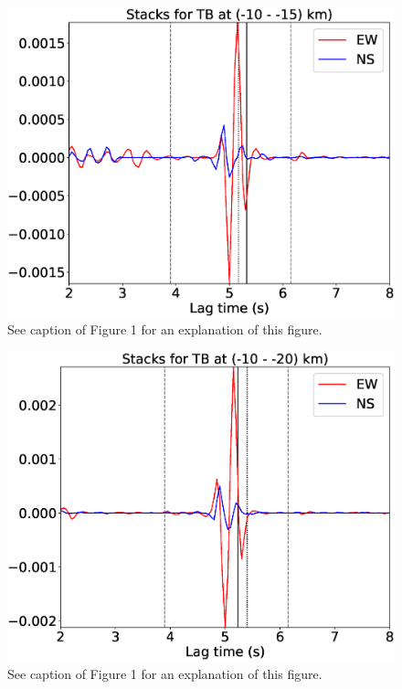 \documentclass[letterpaper, 12pt]{article}
\begin{document}
\begin{figure}[H]
\includegraphics[width=\linewidth]{figures/intervals/TB_-10_-15_stacks.eps}
\caption{See caption of Figure 1 for an explanation of this figure.}
\end{figure}

\begin{figure}[H]
\includegraphics[width=\linewidth]{figures/intervals/TB_-10_-20_stacks.eps}
\caption{See caption of Figure 1 for an explanation of this figure.}
\end{figure}
\end{document}

